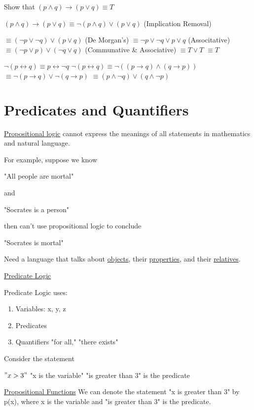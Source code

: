\documentclass{article}
\begin{document}
\hfill \break
Show that $(p\land q)\rightarrow(p\lor q)\equiv T$

\hfill \break
$(p\land q)\rightarrow(p\lor q)\equiv \lnot(p\land q)\lor (p\lor q)$ (Implication Removal)

\hfill \break
$\equiv(\lnot p\lor \lnot q)\lor(p\lor q)$ (De Morgan's)
\hfill \break
$\equiv \lnot p\lor \lnot q \lor p \lor q$ (Associtative)
\hfill \break
$\equiv(\lnot p\lor p)\lor(\lnot q\lor q)$ (Communative \& Associative)
\hfill \break
$\equiv T \lor T$
\hfill \break
$\equiv T$

\hfill \break
$\lnot(p\leftrightarrow q)\equiv p\leftrightarrow \lnot q$
\hfill \break
$\lnot(p\leftrightarrow q)\equiv \lnot((p\rightarrow q)\land(q\rightarrow p))$
\hfill \break
$\equiv \lnot(p\rightarrow q)\lor \lnot(q\rightarrow p)$
\hfill \break
$\equiv(p\land \lnot q)\lor(q\land \lnot p)$

\section{Predicates and Quantifiers}
\underline{Propositional logic} cannot express the meanings of all statements in mathematics and natural language.

\hfill \break
For example, suppose we know

"All people are mortal"

and

"Socrates is a person"

then can't use propositional logic to conclude

"Socrates is mortal"

\hfill \break
Need a language that talks about \underline{objects}, their \underline{properties}, and their \underline{relatives}.

\hfill \break
\underline{Predicate Logic}

\hfill \break
Predicate Logic uses:
\begin{enumerate}
    \item Variables: x, y, z
    \item Predicates
    \item Quantifiers "for all," "there exists"
\end{enumerate}

\hfill \break
Consider the statement

$"x>3"$
\hfill \break
"x is the variable"
\hfill \break
"is greater than 3" is the predicate

\hfill \break
\underline{Propositional Functions}
\hfill \break
We can denote the statement "x is greater than 3" by p(x), where x is the variable and "is greater than 3" is the predicate.
\end{document}
